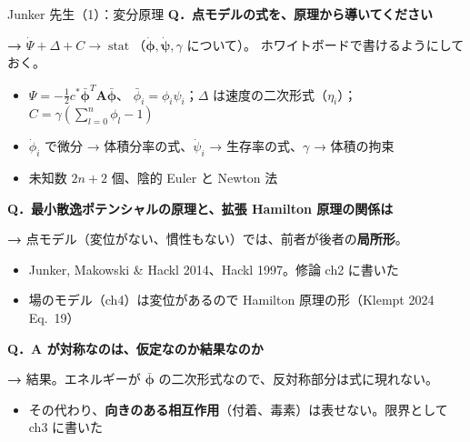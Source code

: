 \documentclass[aspectratio=169,11pt]{beamer}
\newcommand{\Q}[1]{\textbf{Q．#1}}
\newcommand{\A}[1]{\vspace{2pt}\colorbox{c3!10}{\parbox{0.95\linewidth}{%
  \small\textbf{→ }#1}}\vspace{3pt}}
\begin{document}
\begin{frame}[shrink=5]{Junker 先生（1）：変分原理}
\small\Q{点モデルの式を、原理から導いてください}
\A{$\dot\Psi+\Delta+C\to\operatorname{stat}$（$\dot{\bm\phi},\dot{\bm\psi},\gamma$ について）。
ホワイトボードで書けるようにしておく。}
\begin{itemize}\footnotesize
  \item $\Psi=-\tfrac12c^*\bar{\bm\phi}^{\!T}\mathbf A\bar{\bm\phi}$、
        $\bar\phi_i=\phi_i\psi_i$；$\Delta$ は速度の二次形式（$\eta_i$）；
        $C=\gamma(\sum_{l=0}^n\phi_l-1)$
  \item $\dot\phi_i$ で微分 → 体積分率の式、$\dot\psi_i$ → 生存率の式、$\gamma$ → 体積の拘束
  \item 未知数 $2n+2$ 個、陰的 Euler と Newton 法
\end{itemize}
\vspace{3pt}
\small\Q{最小散逸ポテンシャルの原理と、拡張 Hamilton 原理の関係は}
\A{点モデル（変位がない、慣性もない）では、前者が後者の\textbf{局所形}。}
\begin{itemize}\footnotesize
  \item Junker, Makowski \& Hackl 2014、Hackl 1997。修論 ch2 に書いた
  \item 場のモデル（ch4）は変位があるので Hamilton 原理の形（Klempt 2024 Eq.~19）
\end{itemize}
\vspace{3pt}
\small\Q{$\mathbf A$ が対称なのは、仮定なのか結果なのか}
\A{結果。エネルギーが $\bar{\bm\phi}$ の二次形式なので、反対称部分は式に現れない。}
\begin{itemize}\footnotesize
  \item その代わり、\textbf{向きのある相互作用}（付着、毒素）は表せない。限界として ch3 に書いた
\end{itemize}
\end{frame}
\end{document}
